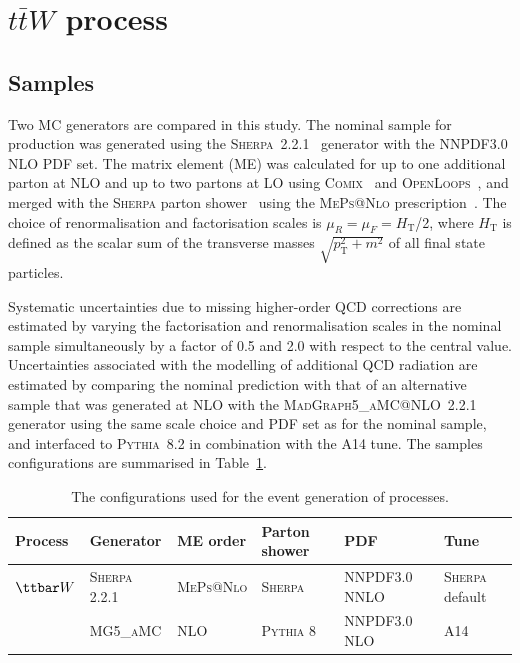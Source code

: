\section{$t\bar{t}W$ process}
\label{sec:ttV}


\subsection{Samples}
Two MC generators are compared in this study.
The nominal sample for \ttW production was generated using the \textsc{Sherpa}~2.2.1~\cite{sherpa} generator with the NNPDF3.0 NLO PDF set.
The matrix element (ME) was calculated for up to one additional parton at NLO and up to two partons at LO using
\textsc{Comix}~\cite{Gleisberg:2008fv} and \textsc{OpenLoops}~\cite{Cascioli:2011va}, and merged with the \textsc{Sherpa} parton shower~\cite{Schumann:2007mg} using the \textsc{MePs@Nlo} prescription~\cite{Hoeche:2012yf}.
The choice of renormalisation and factorisation scales is $\mu_R = \mu_F = H_\textrm{T}$/2, where $H_\textrm{T}$ is defined as the scalar sum of the transverse masses $\sqrt{p_\textrm{T}^2+m^2}$ of all final state particles.



Systematic uncertainties due to missing higher-order QCD corrections are estimated by varying the factorisation and renormalisation scales in the nominal sample simultaneously by a factor of 0.5 and 2.0 with respect to the central value. 
Uncertainties associated with the modelling of additional QCD radiation are estimated by comparing the nominal \ttW prediction with that of an alternative sample that was generated at NLO with the \textsc{MadGraph5\_aMC@NLO}~2.2.1 generator using the same scale choice and PDF set as for the nominal sample, and interfaced to \textsc{Pythia}~8.2 in combination with the A14 tune. 
The samples configurations are summarised in Table~\ref{tab:mcconfig}.
\begin{table}
\begin{center}
\caption{\label{tab:mcconfig}
The configurations used for the event generation of \ttW processes.}
\vspace{0.25cm}
{\small
\setlength\tabcolsep{1.5pt}
\begin{tabular}{llllll}
\hline\hline
Process & Generator & ME order & Parton shower & PDF & Tune  \\
\hline
$\ttbar W$  & \textsc{Sherpa 2.2.1} & \textsc{MePs@Nlo} & \textsc{Sherpa} &  NNPDF3.0 NNLO & \textsc{Sherpa} default \\
& \textsc{MG5\_aMC} & NLO & \textsc{Pythia} 8 & NNPDF3.0 NLO & A14   \\
\hline\hline
\end{tabular}
}
\end{center}
\end{table}


